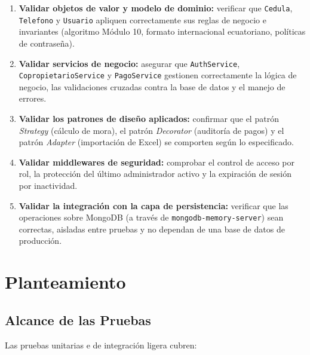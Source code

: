 \documentclass[12pt,a4paper]{article}
\begin{document}
\begin{enumerate}[nosep]
    \item \textbf{Validar objetos de valor y modelo de dominio:} verificar que \texttt{Cedula},
    \texttt{Telefono} y \texttt{Usuario} apliquen correctamente sus reglas de negocio e
    invariantes (algoritmo Módulo 10, formato internacional ecuatoriano, políticas de
    contraseña).
    \item \textbf{Validar servicios de negocio:} asegurar que \texttt{AuthService},
    \texttt{CopropietarioService} y \texttt{PagoService} gestionen correctamente la lógica
    de negocio, las validaciones cruzadas contra la base de datos y el manejo de errores.
    \item \textbf{Validar los patrones de diseño aplicados:} confirmar que el patrón
    \emph{Strategy} (cálculo de mora), el patrón \emph{Decorator} (auditoría de pagos) y el
    patrón \emph{Adapter} (importación de Excel) se comporten según lo especificado.
    \item \textbf{Validar middlewares de seguridad:} comprobar el control de acceso por rol,
    la protección del último administrador activo y la expiración de sesión por
    inactividad.
    \item \textbf{Validar la integración con la capa de persistencia:} verificar que las
    operaciones sobre MongoDB (a través de \texttt{mongodb-memory-server}) sean correctas,
    aisladas entre pruebas y no dependan de una base de datos de producción.
\end{enumerate}

\clearpage

\section{Planteamiento}

\subsection{Alcance de las Pruebas}

Las pruebas unitarias e de integración ligera cubren:
\end{document}
